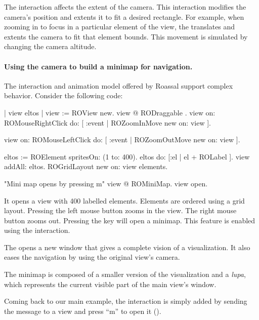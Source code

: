 \documentclass[a4paper,10pt,twoside]{book}
\begin{document}
The  interaction affects the extent of the camera. This interaction modifies the camera's position and extents it to fit a desired rectangle. For example, when zooming in to focus in a particular element of the view, the   translates and extents the camera to fit that element bounds.
This movement is simulated by changing the camera altitude.

\paragraph{Using the camera to build a minimap for navigation.}
The interaction and animation model offered by Roassal support complex behavior. Consider the following code:

\begin{code}{}
| view eltos |
view := ROView new.
view @ RODraggable .
view on: ROMouseRightClick do: [ :event | 
		ROZoomInMove new on: view ].

view on: ROMouseLeftClick do: [ :event | 
		ROZoomOutMove new on: view ].

eltos := ROElement spritesOn: (1 to: 400).
eltos do:  [:el | el + ROLabel  ].
view addAll: eltos.
ROGridLayout new on: view elements.

"Mini map opens by pressing m"
view @ ROMiniMap.
view open.
\end{code}

It opens a view with 400 labelled elements. Elements are ordered using a grid layout. Pressing the left mouse button zooms in the view. The right mouse button zooms out. Pressing the  key will open a minimap. This feature is enabled using the  interaction.

The  opens a new window that gives a complete vision of a visualization. It also eases the navigation by using the original view's camera.

The minimap is composed of a smaller version of the visualization and a \emph{lupa}, which represents the current visible part of the main view's window. 


Coming back to our main example, the interaction is simply added by sending the  message to a view and press ``m'' to open it (). %
\end{document}
